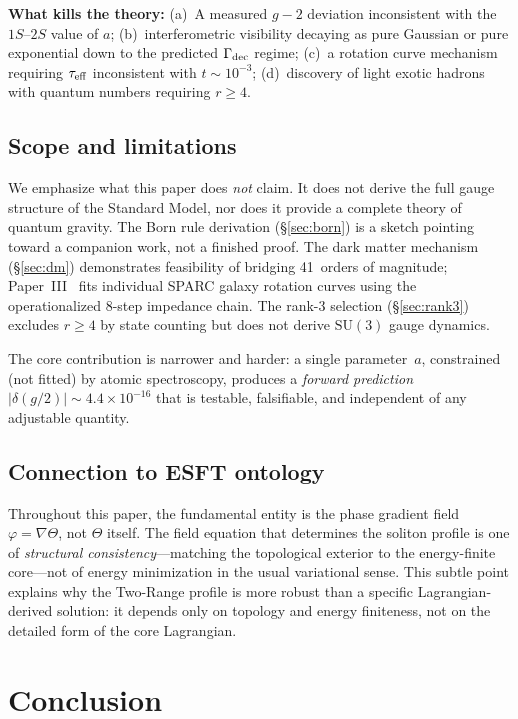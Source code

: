 ﻿\documentclass[a4paper,12pt]{article}
\begin{document}
\textbf{What kills the theory:} (a)~A measured $g{-}2$ deviation
inconsistent with the $1S$--$2S$ value of $a$;
(b)~interferometric visibility decaying as pure Gaussian or pure
exponential down to the predicted $\Gamma_{\rm dec}$ regime;
(c)~a rotation curve mechanism requiring $\tau_{\rm eff}$ inconsistent
with $t\sim 10^{-3}$;
(d)~discovery of light exotic hadrons with quantum numbers requiring
$r\geq 4$.

\subsection{Scope and limitations}

We emphasize what this paper does \emph{not} claim.  It does not derive
the full gauge structure of the Standard Model, nor does it provide a
complete theory of quantum gravity.  The Born rule derivation
(§\ref{sec:born}) is a sketch pointing toward a companion work, not a
finished proof.  The dark matter mechanism (§\ref{sec:dm}) demonstrates
feasibility of bridging 41~orders of magnitude; Paper~III~\cite{PaperIII} fits individual SPARC galaxy rotation curves using the operationalized 8-step impedance chain.  The rank-3 selection
(§\ref{sec:rank3}) excludes $r\geq 4$ by state counting but does not
derive $\mathrm{SU}(3)$ gauge dynamics.

The core contribution is narrower and harder: a single parameter~$a$,
constrained (not fitted) by atomic spectroscopy, produces a
\emph{forward prediction} $|\delta(g/2)|\sim 4.4\times 10^{-16}$ that
is testable, falsifiable, and independent of any adjustable quantity.

\subsection{Connection to ESFT ontology}

Throughout this paper, the fundamental entity is the phase gradient
field $\varphi=\nabla\Theta$, not $\Theta$ itself.  The field equation
that determines the soliton profile is one of \emph{structural
consistency}---matching the topological exterior to the energy-finite
core---not of energy minimization in the usual variational sense.  This
subtle point explains why the Two-Range profile is more robust than a
specific Lagrangian-derived solution: it depends only on topology and
energy finiteness, not on the detailed form of the core Lagrangian.

\section{Conclusion}
\label{sec:conclusion}
\end{document}
